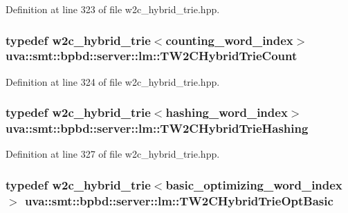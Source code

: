 Definition at line 323 of file w2c\+\_\+hybrid\+\_\+trie.\+hpp.

\hypertarget{namespaceuva_1_1smt_1_1bpbd_1_1server_1_1lm_a2f687eb6b62b4c7ea6d69be0a95a6561}{}
\subsubsection[{T\+W2\+C\+Hybrid\+Trie\+Count}]{\setlength{\rightskip}{0pt plus 5cm}typedef {\bf w2c\+\_\+hybrid\+\_\+trie}$<${\bf counting\+\_\+word\+\_\+index}$>$ {\bf uva\+::smt\+::bpbd\+::server\+::lm\+::\+T\+W2\+C\+Hybrid\+Trie\+Count}}\label{namespaceuva_1_1smt_1_1bpbd_1_1server_1_1lm_a2f687eb6b62b4c7ea6d69be0a95a6561}


Definition at line 324 of file w2c\+\_\+hybrid\+\_\+trie.\+hpp.

\hypertarget{namespaceuva_1_1smt_1_1bpbd_1_1server_1_1lm_a298736611f5173aad25522b255002d1f}{}
\subsubsection[{T\+W2\+C\+Hybrid\+Trie\+Hashing}]{\setlength{\rightskip}{0pt plus 5cm}typedef {\bf w2c\+\_\+hybrid\+\_\+trie}$<${\bf hashing\+\_\+word\+\_\+index}$>$ {\bf uva\+::smt\+::bpbd\+::server\+::lm\+::\+T\+W2\+C\+Hybrid\+Trie\+Hashing}}\label{namespaceuva_1_1smt_1_1bpbd_1_1server_1_1lm_a298736611f5173aad25522b255002d1f}


Definition at line 327 of file w2c\+\_\+hybrid\+\_\+trie.\+hpp.

\hypertarget{namespaceuva_1_1smt_1_1bpbd_1_1server_1_1lm_a55726e9df70d86aab4e861741d877b9c}{}
\subsubsection[{T\+W2\+C\+Hybrid\+Trie\+Opt\+Basic}]{\setlength{\rightskip}{0pt plus 5cm}typedef {\bf w2c\+\_\+hybrid\+\_\+trie}$<${\bf basic\+\_\+optimizing\+\_\+word\+\_\+index}$>$ {\bf uva\+::smt\+::bpbd\+::server\+::lm\+::\+T\+W2\+C\+Hybrid\+Trie\+Opt\+Basic}}\label{namespaceuva_1_1smt_1_1bpbd_1_1server_1_1lm_a55726e9df70d86aab4e861741d877b9c}



